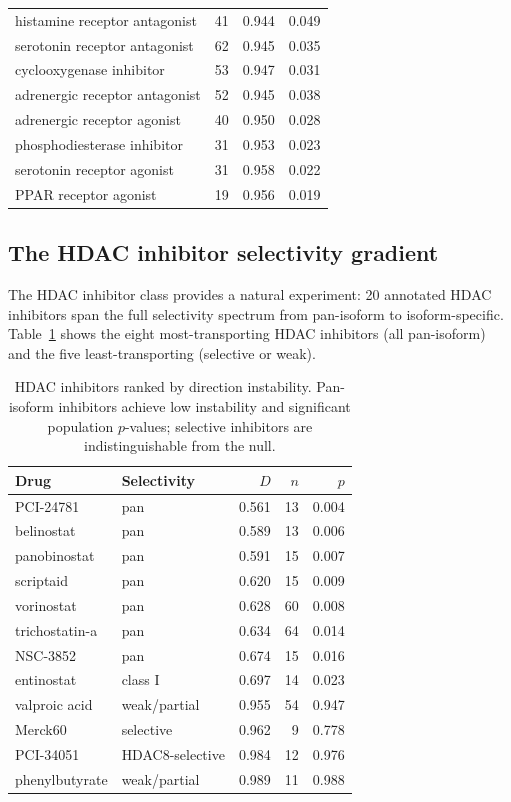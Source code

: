 \documentclass[11pt]{article}
\begin{document}
\begin{table}[t]
\begin{tabular}{lrrr}
histamine receptor antagonist & 41 & 0.944 & 0.049 \\
serotonin receptor antagonist & 62 & 0.945 & 0.035 \\
cyclooxygenase inhibitor & 53 & 0.947 & 0.031 \\
adrenergic receptor antagonist & 52 & 0.945 & 0.038 \\
adrenergic receptor agonist & 40 & 0.950 & 0.028 \\
phosphodiesterase inhibitor & 31 & 0.953 & 0.023 \\
serotonin receptor agonist & 31 & 0.958 & 0.022 \\
PPAR receptor agonist & 19 & 0.956 & 0.019 \\
\bottomrule
\end{tabular}
\end{table}

\subsection{The HDAC inhibitor selectivity gradient}
\label{sec:hdac}

The HDAC inhibitor class provides a natural experiment: 20 annotated HDAC
inhibitors span the full selectivity spectrum from pan-isoform to
isoform-specific. Table~\ref{tab:hdac} shows the eight most-transporting
HDAC inhibitors (all pan-isoform) and the five least-transporting
(selective or weak).

\begin{table}[t]
\centering
\caption{HDAC inhibitors ranked by direction instability. Pan-isoform
inhibitors achieve low instability and significant population $p$-values;
selective inhibitors are indistinguishable from the null.}
\label{tab:hdac}
\small
\begin{tabular}{llrrr}
\toprule
Drug & Selectivity & $D$ & $n$ & $p$ \\
\midrule
PCI-24781 & pan & 0.561 & 13 & 0.004 \\
belinostat & pan & 0.589 & 13 & 0.006 \\
panobinostat & pan & 0.591 & 15 & 0.007 \\
scriptaid & pan & 0.620 & 15 & 0.009 \\
vorinostat & pan & 0.628 & 60 & 0.008 \\
trichostatin-a & pan & 0.634 & 64 & 0.014 \\
NSC-3852 & pan & 0.674 & 15 & 0.016 \\
entinostat & class I & 0.697 & 14 & 0.023 \\
\midrule
valproic acid & weak/partial & 0.955 & 54 & 0.947 \\
Merck60 & selective & 0.962 & 9 & 0.778 \\
PCI-34051 & HDAC8-selective & 0.984 & 12 & 0.976 \\
phenylbutyrate & weak/partial & 0.989 & 11 & 0.988 \\
\bottomrule
\end{tabular}
\end{table}
\end{document}
